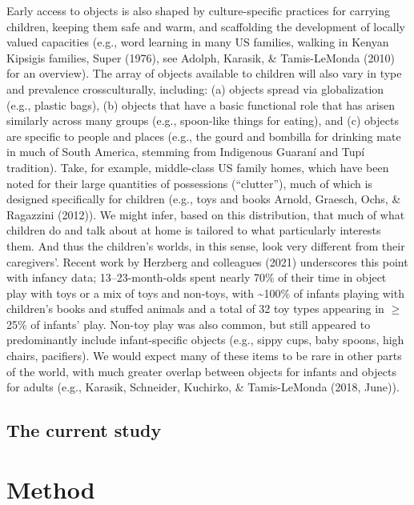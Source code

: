\documentclass[10pt, letterpaper]{article}
\begin{document}
Early access to objects is also shaped by culture-specific practices for
carrying children, keeping them safe and warm, and scaffolding the
development of locally valued capacities (e.g., word learning in many US
families, walking in Kenyan Kipsigis families, Super (1976), see Adolph,
Karasik, \& Tamis-LeMonda (2010) for an overview). The array of objects
available to children will also vary in type and prevalence
crossculturally, including: (a) objects spread via globalization (e.g.,
plastic bags), (b) objects that have a basic functional role that has
arisen similarly across many groups (e.g., spoon-like things for
eating), and (c) objects are specific to people and places (e.g., the
gourd and bombilla for drinking mate in much of South America, stemming
from Indigenous Guaraní and Tupí tradition). Take, for example,
middle-class US family homes, which have been noted for their large
quantities of possessions (``clutter''), much of which is designed
specifically for children (e.g., toys and books Arnold, Graesch, Ochs,
\& Ragazzini (2012)). We might infer, based on this distribution, that
much of what children do and talk about at home is tailored to what
particularly interests them. And thus the children's worlds, in this
sense, look very different from their caregivers'. Recent work by
Herzberg and colleagues (2021) underscores this point with infancy data;
13--23-month-olds spent nearly 70\% of their time in object play with
toys or a mix of toys and non-toys, with \textasciitilde100\% of infants
playing with children's books and stuffed animals and a total of 32 toy
types appearing in \(\ge\) 25\% of infants' play. Non-toy play was also
common, but still appeared to predominantly include infant-specific
objects (e.g., sippy cups, baby spoons, high chairs, pacifiers). We
would expect many of these items to be rare in other parts of the world,
with much greater overlap between objects for infants and objects for
adults (e.g., Karasik, Schneider, Kuchirko, \& Tamis-LeMonda (2018,
June)).

\hypertarget{the-current-study}{%
\subsection{The current study}\label{the-current-study}}

\hypertarget{method}{%
\section{Method}\label{method}}
\end{document}
